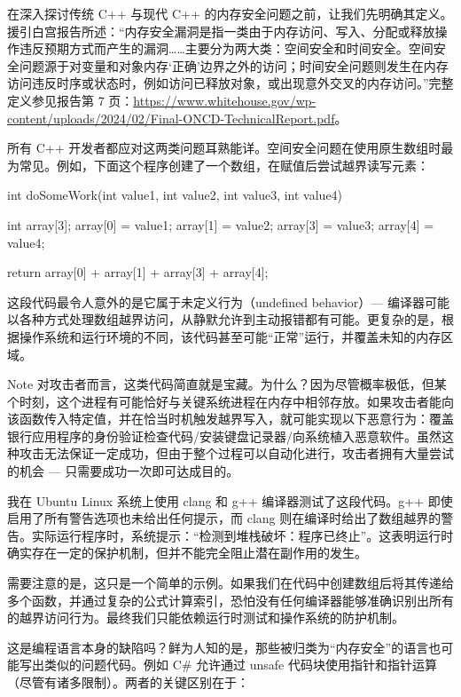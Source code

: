 
在深入探讨传统 C++ 与现代 C++ 的内存安全问题之前，让我们先明确其定义。援引白宫报告所述：“内存安全漏洞是指一类由于内存访问、写入、分配或释放操作违反预期方式而产生的漏洞……主要分为两大类：空间安全和时间安全。空间安全问题源于对变量和对象内存‘正确’边界之外的访问；时间安全问题则发生在内存访问违反时序或状态时，例如访问已释放对象，或出现意外交叉的内存访问。”完整定义参见报告第 7 页：\url{https://www.whitehouse.gov/wp-content/uploads/2024/02/Final-ONCD-TechnicalReport.pdf}。

所有 C++ 开发者都应对这两类问题耳熟能详。空间安全问题在使用原生数组时最为常见。例如，下面这个程序创建了一个数组，在赋值后尝试越界读写元素：

\begin{cpp}
int doSomeWork(int value1, int value2, int value3, int value4) {
  int array[3];
  array[0] = value1;
  array[1] = value2;
  array[3] = value3;
  array[4] = value4;

  return array[0] + array[1] + array[3] + array[4];
}
\end{cpp}

这段代码最令人意外的是它属于未定义行为（undefined behavior）--- 编译器可能以各种方式处理数组越界访问，从静默允许到主动报错都有可能。更复杂的是，根据操作系统和运行环境的不同，该代码甚至可能“正常”运行，并覆盖未知的内存区域。

\begin{myNotic}{Note}
对攻击者而言，这类代码简直就是宝藏。为什么？因为尽管概率极低，但某个时刻，这个进程有可能恰好与关键系统进程在内存中相邻存放。如果攻击者能向该函数传入特定值，并在恰当时机触发越界写入，就可能实现以下恶意行为：覆盖银行应用程序的身份验证检查代码/安装键盘记录器/向系统植入恶意软件。虽然这种攻击无法保证一定成功，但由于整个过程可以自动化进行，攻击者拥有大量尝试的机会 --- 只需要成功一次即可达成目的。
\end{myNotic}

我在 Ubuntu Linux 系统上使用 clang 和 g++ 编译器测试了这段代码。g++ 即使启用了所有警告选项也未给出任何提示，而 clang 则在编译时给出了数组越界的警告。实际运行程序时，系统提示：“检测到堆栈破坏：程序已终止”。这表明运行时确实存在一定的保护机制，但并不能完全阻止潜在副作用的发生。

需要注意的是，这只是一个简单的示例。如果我们在代码中创建数组后将其传递给多个函数，并通过复杂的公式计算索引，恐怕没有任何编译器能够准确识别出所有的越界访问行为。最终我们只能依赖运行时测试和操作系统的防护机制。

这是编程语言本身的缺陷吗？鲜为人知的是，那些被归类为“内存安全”的语言也可能写出类似的问题代码。例如 C\# 允许通过 unsafe 代码块使用指针和指针运算（尽管有诸多限制）。两者的关键区别在于：

